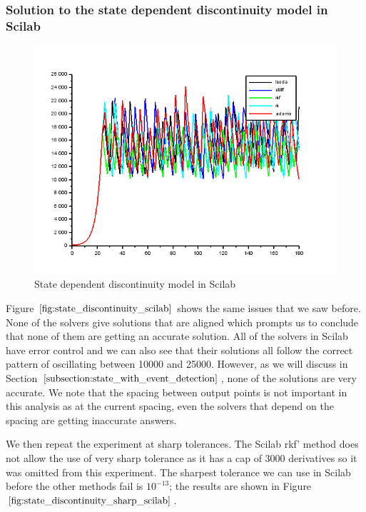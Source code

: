 \subsubsection{Solution to the state dependent discontinuity model in Scilab}
\begin{figure}[H]
\centering
\includegraphics[width=0.7\linewidth]{./figures/state_discontinuity_scilab}
\caption{State dependent discontinuity model in Scilab}
\label{fig:state_discontinuity_scilab}
\end{figure}

Figure $\ref{fig:state_discontinuity_scilab}$ shows the same issues that we saw before. None of the solvers give solutions that are aligned which prompts us to conclude that none of them are getting an accurate solution. All of the solvers in Scilab have error control and we can also see that their solutions all follow the correct pattern of oscillating between 10000 and 25000. However, as we will discuss in Section $\ref{subsection:state_with_event_detection}$, none of the solutions are very accurate. We note that the spacing between output points is not important in this analysis as at the current spacing, even the solvers that depend on the spacing are getting inaccurate answers.

We then repeat the experiment at sharp tolerances. The Scilab rkf' method does not allow the use of very sharp tolerance as it has a cap of 3000 derivatives so it was omitted from this experiment. The sharpest tolerance we can use in Scilab before the other methods fail is $10^{-13}$; the results are shown in Figure $\ref{fig:state_discontinuity_sharp_scilab}$.

